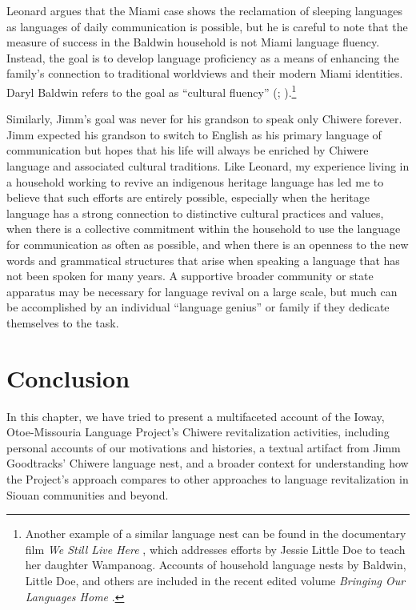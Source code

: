\documentclass[output=paper]{LSP/langsci}
\begin{document}
Leonard argues that the Miami case shows the reclamation of sleeping languages as languages of daily communication is possible, but he is careful to note that the measure of success in the Baldwin household is not Miami language fluency. Instead, the goal is to develop language proficiency as a means of enhancing the family's connection to traditional worldviews and their modern Miami identities. Daryl Baldwin refers to the goal as ``cultural fluency'' (\citealt[36--37]{Leonard2007}; \citeyear[139--140]{Leonard2011}).\footnote{Another example of a similar language nest can be found in the documentary film \emph{We Still Live Here} \citep{Makepeace2011}, which addresses efforts by Jessie Little Doe to teach her daughter Wampanoag. Accounts of household language nests by Baldwin, Little Doe, and others are included in the recent edited volume \emph{Bringing Our Languages Home} \citep{Hinton2013}.} 

Similarly, Jimm's goal was never for his grandson to speak only Chiwere forever. Jimm expected his grandson to switch to English as his primary language of communication but hopes that his life will always be enriched by Chiwere language and associated cultural traditions. Like Leonard, my experience living in a household working to revive an indigenous heritage language has led me to believe that such efforts are entirely possible, especially when the heritage language has a strong connection to distinctive cultural practices and values, when there is a collective commitment within the household to use the language for communication as often as possible, and when there is an openness to the new words and grammatical structures that arise when speaking a language that has not been spoken for many years. A supportive broader community or state apparatus may be necessary for language revival on a large scale, but much can be accomplished by an individual ``language genius'' or family if they dedicate themselves to the task.

\section{Conclusion}
In this chapter, we have tried to present a multifaceted account of the Ioway, Otoe-Missouria Language Project's Chiwere revitalization activities, including personal accounts of our motivations and histories, a textual artifact from Jimm Goodtracks' Chiwere language nest, and a broader context for understanding how the Project's approach compares to other approaches to language revitalization in Siouan communities and beyond.
\end{document}
